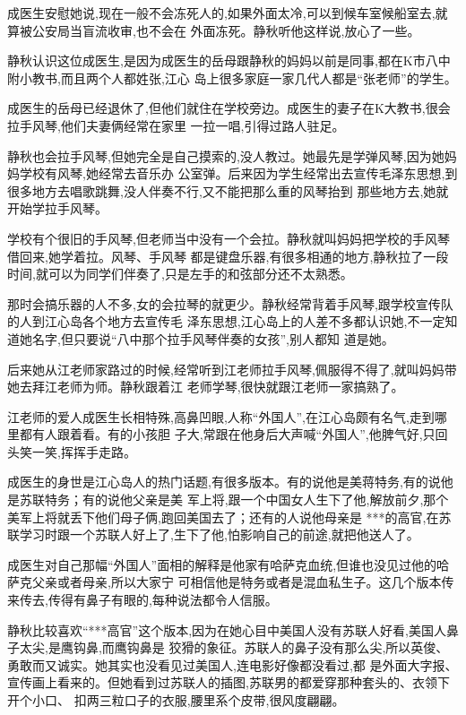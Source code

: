 ﻿\documentclass[12pt]{article}
\begin{document}
成医生安慰她说,现在一般不会冻死人的,如果外面太冷,可以到候车室候船室去,就算被公安局当盲流收审,也不会在
外面冻死。静秋听他这样说,放心了一些。

静秋认识这位成医生,是因为成医生的岳母跟静秋的妈妈以前是同事,都在K市八中附小教书,而且两个人都姓张,江心
岛上很多家庭一家几代人都是``张老师''的学生。

成医生的岳母已经退休了,但他们就住在学校旁边。成医生的妻子在K大教书,很会拉手风琴,他们夫妻俩经常在家里
一拉一唱,引得过路人驻足。

静秋也会拉手风琴,但她完全是自己摸索的,没人教过。她最先是学弹风琴,因为她妈妈学校有风琴,她经常去音乐办
公室弹。后来因为学生经常出去宣传毛泽东思想,到很多地方去唱歌跳舞,没人伴奏不行,又不能把那么重的风琴抬到
那些地方去,她就开始学拉手风琴。

学校有个很旧的手风琴,但老师当中没有一个会拉。静秋就叫妈妈把学校的手风琴借回来,她学着拉。风琴、手风琴
都是键盘乐器,有很多相通的地方,静秋拉了一段时间,就可以为同学们伴奏了,只是左手的和弦部分还不太熟悉。

那时会搞乐器的人不多,女的会拉琴的就更少。静秋经常背着手风琴,跟学校宣传队的人到江心岛各个地方去宣传毛
泽东思想,江心岛上的人差不多都认识她,不一定知道她名字,但只要说``八中那个拉手风琴伴奏的女孩'',别人都知
道是她。

后来她从江老师家路过的时候,经常听到江老师拉手风琴,佩服得不得了,就叫妈妈带她去拜江老师为师。静秋跟着江
老师学琴,很快就跟江老师一家搞熟了。

江老师的爱人成医生长相特殊,高鼻凹眼,人称``外国人'',在江心岛颇有名气,走到哪里都有人跟着看。有的小孩胆
子大,常跟在他身后大声喊``外国人'',他脾气好,只回头笑一笑,挥挥手走路。

成医生的身世是江心岛人的热门话题,有很多版本。有的说他是美蒋特务,有的说他是苏联特务；有的说他父亲是美
军上将,跟一个中国女人生下了他,解放前夕,那个美军上将就丢下他们母子俩,跑回美国去了；还有的人说他母亲是
***的高官,在苏联学习时跟一个苏联人好上了,生下了他,怕影响自己的前途,就把他送人了。

成医生对自己那幅``外国人''面相的解释是他家有哈萨克血统,但谁也没见过他的哈萨克父亲或者母亲,所以大家宁
可相信他是特务或者是混血私生子。这几个版本传来传去,传得有鼻子有眼的,每种说法都令人信服。

静秋比较喜欢``***高官''这个版本,因为在她心目中美国人没有苏联人好看,美国人鼻子太尖,是鹰钩鼻,而鹰钩鼻是
狡猾的象征。苏联人的鼻子没有那么尖,所以英俊、勇敢而又诚实。她其实也没看见过美国人,连电影好像都没看过,都
是外面大字报、宣传画上看来的。但她看到过苏联人\myrule 的插图,苏联男的都爱穿那种套头的、衣领下开个小口、
扣两三粒口子的衣服,腰里系个皮带,很风度翩翩。
\end{document}
